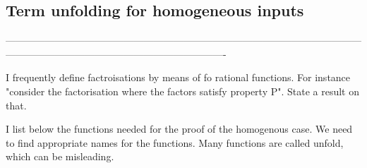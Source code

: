 
\subsection{Term unfolding for homogeneous inputs}
\label{sec:homo-unfold}


-------------------------------------------------------------------------------------------------------------------------------------------------------------------------------

I frequently define factroisations by means of fo rational functions. For instance "consider the factorisation where the factors satisfy property P". State a result on that.


I list below the functions needed for the proof of the homogenous case. We need to find appropriate names for the functions. Many functions are called unfold, which can be misleading.

